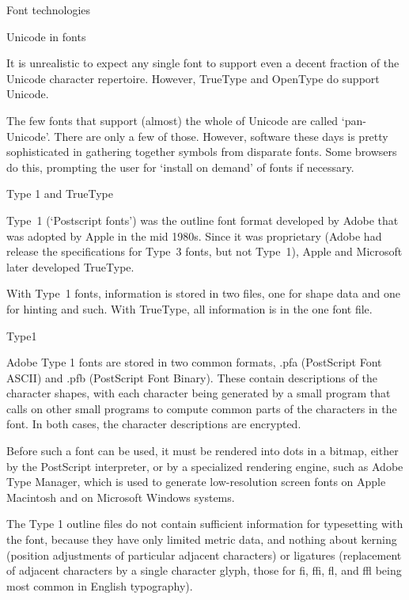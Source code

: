  {Font technologies}

 {Unicode in fonts}
\label{sec:unicode-font}

It is unrealistic to expect any single font to support even a decent
fraction of the Unicode character repertoire. However, TrueType and
OpenType do support Unicode.

The few fonts that support (almost) the whole of Unicode are called
`pan-Unicode'. There are only a few of those. However, software these
days is pretty sophisticated in gathering together symbols from
disparate fonts. Some browsers do this, prompting the user for
`install on demand' of fonts if necessary.

 {Type 1 and TrueType}


Type~1 (`Postscript fonts')
was the outline font format developed by Adobe that was adopted by
Apple in the mid 1980s. Since it was proprietary (Adobe had release
the specifications for Type~3 fonts, but not
Type~1), Apple and Microsoft later developed
TrueType.

With Type~1 fonts, information is stored in two files, one for shape
data and one for hinting and such. With TrueType, all information is
in the one font file.

 {Type1}


Adobe Type 1 fonts are stored in two common formats, .pfa (PostScript
Font ASCII) and .pfb (PostScript Font Binary). These contain
descriptions of the character shapes, with each character being
generated by a small program that calls on other small programs to
compute common parts of the characters in the font. In both cases, the
character descriptions are encrypted.

Before such a font can be used, it must be rendered into dots in a
bitmap, either by the PostScript interpreter, or by a specialized
rendering engine, such as Adobe Type Manager, which is used to
generate low-resolution screen fonts on Apple Macintosh and on
Microsoft Windows systems.

The Type 1 outline files do not contain sufficient information for
typesetting with the font, because they have only limited metric data,
and nothing about kerning (position adjustments of particular adjacent
characters) or ligatures (replacement of adjacent characters by a
single character glyph, those for fi, ffi, fl, and ffl being most
common in English typography).

